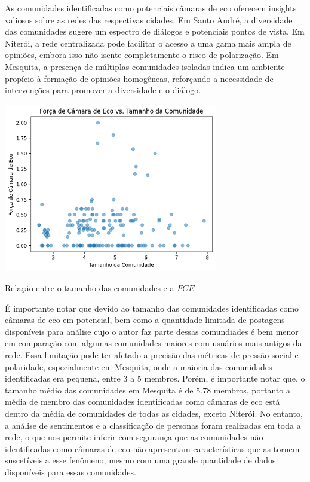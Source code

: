 As comunidades identificadas como potenciais câmaras de eco oferecem insights valiosos sobre as redes das respectivas cidades. Em Santo André, a diversidade das comunidades sugere um espectro de diálogos e potenciais pontos de vista. Em Niterói, a rede centralizada pode facilitar o acesso a uma gama mais ampla de opiniões, embora isso não isente completamente o risco de polarização. Em Mesquita, a presença de múltiplas comunidades isoladas indica um ambiente propício à formação de opiniões homogêneas, reforçando a necessidade de intervenções para promover a diversidade e o diálogo.

\begin{quadro}[htb]
	\centering
	\includegraphics[width=0.7\textwidth]{images/echo_chamber_strength_by_size.png}
	\caption{Relação entre o tamanho das comunidades e a $FCE$}
	\label{fig:echo_chamber_strength_by_size}
\end{quadro}

É importante notar que devido ao tamanho das comunidades identificadas como câmaras de eco em potencial, bem como a quantidade limitada de postagens disponíveis para análise cujo o autor faz parte dessas comundiades é bem menor em comparação com algumas comunidades maiores com usuários mais antigos da rede. Essa limitação pode ter afetado a precisão das métricas de pressão social e polaridade, especialmente em Mesquita, onde a maioria das comunidades identificadas era pequena, entre 3 a 5 membros. Porém, é importante notar que, o tamanho médio das comunidades em Mesquita é de 5.78 membros, portanto a média de membro das comunidades identificadas como câmaras de eco está dentro da média de comunidades de todas as cidades, exceto Niterói. No entanto, a análise de sentimentos e a classificação de personas foram realizadas em toda a rede, o que nos permite inferir com segurança que as comunidades não identificadas como câmaras de eco não apresentam características que as tornem suscetíveis a esse fenômeno, mesmo com uma grande quantidade de dados disponíveis para essas comunidades.

